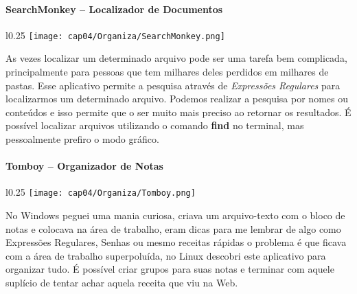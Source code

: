 \paragraph{SearchMonkey – Localizador de Documentos}
\begin{minipage}{\linewidth}
 \vspace{5pt}
 \begin{wrapfigure}{l}{0.25\textwidth}
  \vspace{-\baselineskip}
  \texttt{[image: cap04/Organiza/SearchMonkey.png]} 
 \end{wrapfigure}
 As vezes localizar um determinado arquivo pode ser uma tarefa bem complicada, principalmente para pessoas que tem milhares deles perdidos em milhares de pastas. Esse aplicativo permite a pesquisa através de \textit{Expressões Regulares} para localizarmos um determinado arquivo. Podemos realizar a pesquisa por nomes ou conteúdos e isso permite que o ser muito mais preciso ao retornar os resultados. É possível localizar arquivos utilizando o comando \textbf{find} no terminal, mas pessoalmente prefiro o modo gráfico.
\end{minipage}

\paragraph{Tomboy – Organizador de Notas}
\begin{minipage}{\linewidth}
 \vspace{5pt}
 \begin{wrapfigure}{l}{0.25\textwidth}
  \vspace{-\baselineskip}
  \texttt{[image: cap04/Organiza/Tomboy.png]} 
 \end{wrapfigure}
 No Windows peguei uma mania curiosa, criava um arquivo-texto com o bloco de notas e colocava na área de trabalho, eram dicas para me lembrar de algo como Expressões Regulares, Senhas ou mesmo receitas rápidas o problema é que ficava com a área de trabalho superpoluída, no Linux descobri este aplicativo para organizar tudo. É possível criar grupos para suas notas e terminar com aquele suplício de tentar achar aquela receita que viu na Web. 
\end{minipage}

